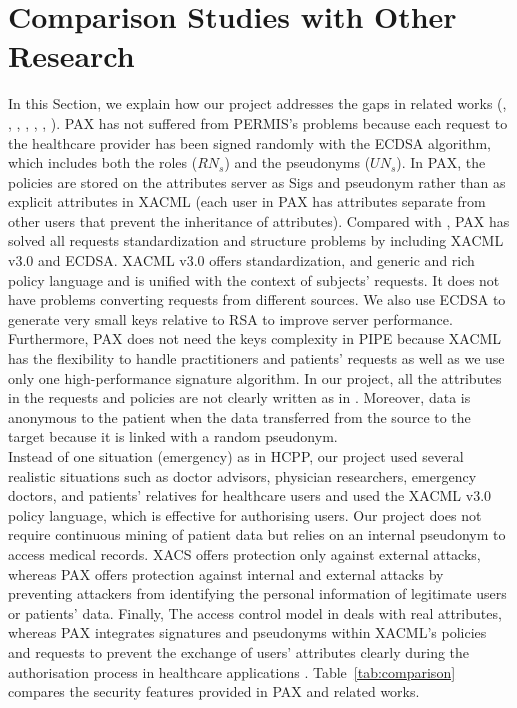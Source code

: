 \documentclass[journal,article,submit,moreauthors,pdftex]{Definitions/mdpi}
\begin{document}
\section{Comparison Studies with Other Research}
\label{sec:comparison}
In this Section, we explain how our project addresses the gaps in related works (\cite{fp12}, \cite{fp2}, \cite{fp6}, \cite{fp13}, \cite{fp16}, \cite{fp17}, \cite{fp35}). PAX has not suffered from PERMIS's problems \cite{fp16} because each request to the healthcare provider has been signed randomly with the ECDSA algorithm, which includes both the roles ($RN_s$) and the pseudonyms ($UN_s$). In PAX, the policies are stored on the attributes server as Sigs and pseudonym rather than as explicit attributes in XACML (each user in PAX has attributes separate from other users that prevent the inheritance of attributes). Compared with \cite{fp6}, PAX has solved all requests standardization and structure problems by including XACML v3.0 and ECDSA. XACML v3.0 offers standardization, and generic and rich policy language and is unified with the context of subjects' requests. It does not have problems converting requests from different sources. We also use ECDSA to generate very small keys relative to RSA to improve server performance. Furthermore, PAX does not need the keys complexity in PIPE \cite{fp2} because XACML has the flexibility to handle practitioners and patients' requests as well as we use only one high-performance signature algorithm. In our project, all the attributes in the requests and policies are not clearly written as in \cite{fp12}. Moreover, data is anonymous to the patient when the data transferred from the source to the target because it is linked with a random pseudonym.\\
Instead of one situation (emergency) as in HCPP, our project used several realistic situations such as doctor advisors, physician researchers, emergency doctors, and patients' relatives for healthcare users and used the XACML v3.0 policy language, which is effective for authorising users. Our project does not require continuous mining \cite{fp13} of patient data but relies on an internal pseudonym to access medical records. XACS \cite{fp17} offers protection only against external attacks, whereas  PAX offers protection against internal and external attacks by preventing attackers from identifying the personal information of legitimate users or patients' data. Finally, The access control model in \cite{fp35} deals with real attributes, whereas PAX integrates signatures and pseudonyms within XACML's policies and requests to prevent the exchange of users' attributes clearly during the authorisation process in healthcare applications \cite{fp35}. Table~\ref{tab:comparison} compares the security features provided in PAX and related works.
\end{document}
